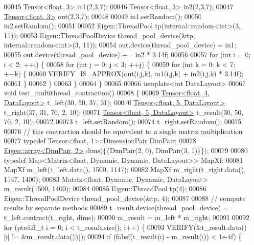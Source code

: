 \begin{DoxyCode}
00045   \hyperlink{class_eigen_1_1_tensor}{Tensor<float, 3>} in1(2,3,7);
00046   \hyperlink{class_eigen_1_1_tensor}{Tensor<float, 3>} in2(2,3,7);
00047   \hyperlink{class_eigen_1_1_tensor}{Tensor<float, 3>} out(2,3,7);
00048 
00049   in1.setRandom();
00050   in2.setRandom();
00051 
00052   Eigen::ThreadPool tp(internal::random<int>(3, 11));
00053   Eigen::ThreadPoolDevice thread\_pool\_device(&tp, internal::random<int>(3, 11));
00054   out.device(thread\_pool\_device) = in1;
00055   out.device(thread\_pool\_device) += in2 * 3.14f;
00056 
00057   \textcolor{keywordflow}{for} (\textcolor{keywordtype}{int} i = 0; i < 2; ++i) \{
00058     \textcolor{keywordflow}{for} (\textcolor{keywordtype}{int} j = 0; j < 3; ++j) \{
00059       \textcolor{keywordflow}{for} (\textcolor{keywordtype}{int} k = 0; k < 7; ++k) \{
00060         VERIFY\_IS\_APPROX(out(i,j,k), in1(i,j,k) + in2(i,j,k) * 3.14f);
00061       \}
00062     \}
00063   \}
00064 \}
00065 
00066 \textcolor{keyword}{template}<\textcolor{keywordtype}{int} DataLayout>
00067 \textcolor{keywordtype}{void} test\_multithread\_contraction()
00068 \{
00069   \hyperlink{class_eigen_1_1_tensor}{Tensor<float, 4, DataLayout>} t\_left(30, 50, 37, 31);
00070   \hyperlink{class_eigen_1_1_tensor}{Tensor<float, 5, DataLayout>} t\_right(37, 31, 70, 2, 10);
00071   \hyperlink{class_eigen_1_1_tensor}{Tensor<float, 5, DataLayout>} t\_result(30, 50, 70, 2, 10);
00072 
00073   t\_left.setRandom();
00074   t\_right.setRandom();
00075 
00076   \textcolor{comment}{// this contraction should be equivalent to a single matrix multiplication}
00077   \textcolor{keyword}{typedef} \hyperlink{class_eigen_1_1_tensor}{Tensor<float, 1>::DimensionPair} DimPair;
00078   \hyperlink{class_eigen_1_1array}{Eigen::array<DimPair, 2>} dims(\{\{DimPair(2, 0), DimPair(3, 1)\}\});
00079 
00080   \textcolor{keyword}{typedef} Map<Matrix<float, Dynamic, Dynamic, DataLayout>> MapXf;
00081   MapXf m\_left(t\_left.data(), 1500, 1147);
00082   MapXf m\_right(t\_right.data(), 1147, 1400);
00083   Matrix<float, Dynamic, Dynamic, DataLayout> m\_result(1500, 1400);
00084 
00085   Eigen::ThreadPool tp(4);
00086   Eigen::ThreadPoolDevice thread\_pool\_device(&tp, 4);
00087 
00088   \textcolor{comment}{// compute results by separate methods}
00089   t\_result.device(thread\_pool\_device) = t\_left.contract(t\_right, dims);
00090   m\_result = m\_left * m\_right;
00091 
00092  \textcolor{keywordflow}{for} (ptrdiff\_t i = 0; i < t\_result.size(); i++) \{
00093     VERIFY(&t\_result.data()[i] != &m\_result.data()[i]);
00094     \textcolor{keywordflow}{if} (fabsf(t\_result(i) - m\_result(i)) < 1e-4f) \{

\end{DoxyCode}
